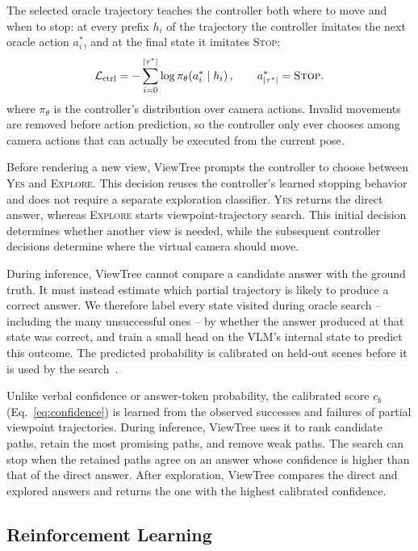 \documentclass[sigconf,10pt]{acmart}
\begin{document}
	
	The selected oracle trajectory teaches the controller both where to move and when to stop: at every prefix $h_i$ of the trajectory the controller imitates the next oracle action $a_i^{*}$, and at the final state it imitates \textsc{Stop}:
\begin{equation}
	\mathcal{L}_{\mathrm{ctrl}}=-\sum_{i=0}^{|\tau^{*}|}\log\pi_{\theta}\!\left(a_i^{*}\mid h_i\right),\qquad
	a^{*}_{|\tau^{*}|}=\textsc{Stop}.
	\label{eq:ctrl}
\end{equation}
where $\pi_{\theta}$ is the controller's distribution over camera actions. Invalid movements are removed before action prediction, so the controller only ever chooses among camera actions that can actually be executed from the current pose.

	Before rendering a new view, ViewTree prompts the controller to choose between \textsc{Yes} and \textsc{Explore}. This decision reuses the controller's learned stopping behavior and does not require a separate exploration classifier. \textsc{Yes} returns the direct answer, whereas \textsc{Explore} starts viewpoint-trajectory search. This initial decision determines whether another view is needed, while the subsequent controller decisions determine where the virtual camera should move.
	
	
	During inference, ViewTree cannot compare a candidate answer with the ground truth. It must instead estimate which partial trajectory is likely to produce a correct answer. We therefore label every state visited during oracle search -- including the many unsuccessful ones -- by whether the answer produced at that state was correct, and train a small head on the VLM's internal state to predict this outcome. The predicted probability is calibrated on held-out scenes before it is used by the search~\cite{guo2017calibration}.

	Unlike verbal confidence or answer-token probability, the calibrated score $c_b$ (Eq.~\ref{eq:confidence}) is learned from the observed successes and failures of partial viewpoint trajectories. During inference, ViewTree uses it to rank candidate paths, retain the most promising paths, and remove weak paths. The search can stop when the retained paths agree on an answer whose confidence is higher than that of the direct answer. After exploration, ViewTree compares the direct and explored answers and returns the one with the highest calibrated confidence.
	
	\subsection{Reinforcement Learning}
	
\end{document}
